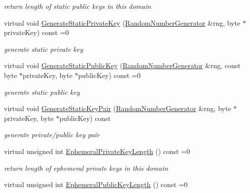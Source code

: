 \begin{DoxyCompactItemize}
\begin{DoxyCompactList}\small\item\em return length of static public keys in this domain \item\end{DoxyCompactList}\item 
virtual void \hyperlink{class_authenticated_key_agreement_domain_a00d9b12028e9ecb61af6d0f312965c6f}{GenerateStaticPrivateKey} (\hyperlink{class_random_number_generator}{RandomNumberGenerator} \&rng, byte $\ast$privateKey) const =0
\begin{DoxyCompactList}\small\item\em generate static private key \item\end{DoxyCompactList}\item 
virtual void \hyperlink{class_authenticated_key_agreement_domain_a853885a901ac7c4f8c51fd177df5d96c}{GenerateStaticPublicKey} (\hyperlink{class_random_number_generator}{RandomNumberGenerator} \&rng, const byte $\ast$privateKey, byte $\ast$publicKey) const =0
\begin{DoxyCompactList}\small\item\em generate static public key \item\end{DoxyCompactList}\item 
virtual void \hyperlink{class_authenticated_key_agreement_domain_a164d5f09c1af319f4bd4a4d45c4b9309}{GenerateStaticKeyPair} (\hyperlink{class_random_number_generator}{RandomNumberGenerator} \&rng, byte $\ast$privateKey, byte $\ast$publicKey) const 
\begin{DoxyCompactList}\small\item\em generate private/public key pair \item\end{DoxyCompactList}\item 
\hypertarget{class_authenticated_key_agreement_domain_a449deae54019f6dfc9677e721a193004}{
virtual unsigned int \hyperlink{class_authenticated_key_agreement_domain_a449deae54019f6dfc9677e721a193004}{EphemeralPrivateKeyLength} () const =0}
\label{class_authenticated_key_agreement_domain_a449deae54019f6dfc9677e721a193004}

\begin{DoxyCompactList}\small\item\em return length of ephemeral private keys in this domain \item\end{DoxyCompactList}\item 
\hypertarget{class_authenticated_key_agreement_domain_a3dbef507ea4fd300ad8b2afb4d7afbe9}{
virtual unsigned int \hyperlink{class_authenticated_key_agreement_domain_a3dbef507ea4fd300ad8b2afb4d7afbe9}{EphemeralPublicKeyLength} () const =0}
\label{class_authenticated_key_agreement_domain_a3dbef507ea4fd300ad8b2afb4d7afbe9}


\end{DoxyCompactItemize}
